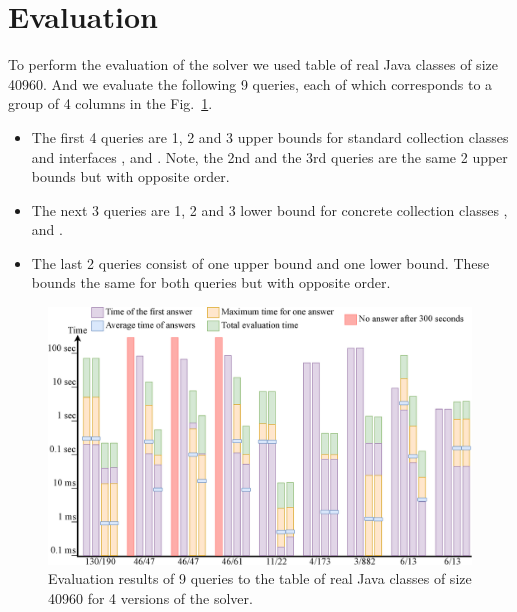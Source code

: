 \section{Evaluation}
\label{sec:eval}
To perform the evaluation of the solver we used table of real Java classes of size 40960.
And we evaluate the following 9 queries, each of which corresponds to a group of 4 columns in the Fig.~\ref{fig:eval-diagram}.
\begin{itemize}
    \item The first 4 queries are 1, 2 and 3 upper bounds for standard collection classes and interfaces ,  and . Note, the 2nd and the 3rd queries are the same 2 upper bounds but with opposite order.
    \item The next 3 queries are 1, 2 and 3 lower bound for concrete collection classes ,  and .
    \item The last 2 queries consist of one upper bound and one lower bound. These bounds the same for both queries but with opposite order.
\end{itemize}

\begin{figure}[h]
  \includegraphics[width=1\textwidth]{eval_diagram.eps}
  \caption{Evaluation results of 9 queries to the table of real Java classes of size 40960 for 4 versions of the solver.}
  \label{fig:eval-diagram}
\end{figure}

